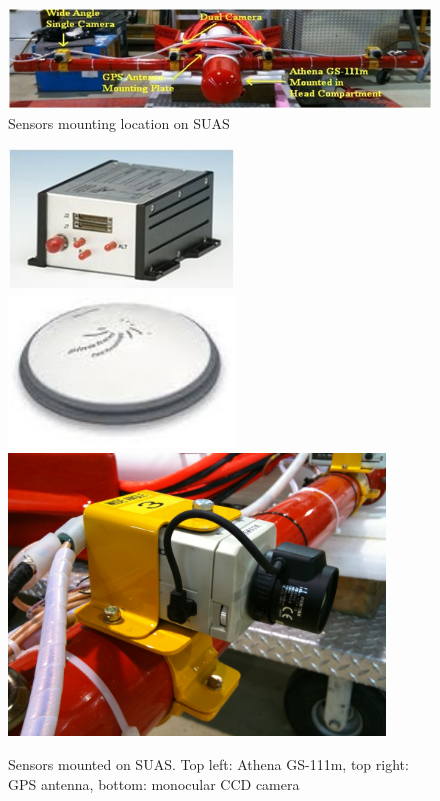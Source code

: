 \begin{figure}[h]
  \centering
  \includegraphics[width=14cm,keepaspectratio=true]{./Figures/SUAS.jpg}
  \caption{Sensors mounting location on SUAS}
  \label{fig:SUAS}
\end{figure}

\begin{figure}[h]
  \centering
  \includegraphics[width=6cm,keepaspectratio=true]{./Figures/athena.jpg}
  \includegraphics[width=6cm,keepaspectratio=true]{./Figures/GPS_antenna.jpg}
  \includegraphics[width=10cm,keepaspectratio=true]{./Figures/wide_cam.jpg}
  \caption{Sensors mounted on SUAS. Top left: Athena
  GS-111m, top right: GPS antenna, bottom: monocular CCD camera}
  \label{fig:SUAS_sensors}
\end{figure}


